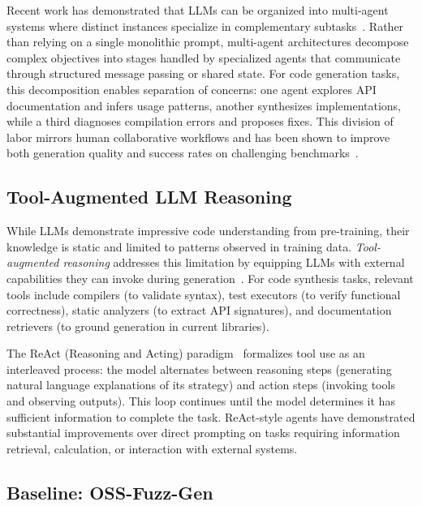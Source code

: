 \documentclass[sigconf,review,anonymous]{acmart}
\begin{document}
Recent work has demonstrated that LLMs can be organized into multi-agent systems where distinct instances specialize in complementary subtasks~\cite{CITE:MultiAgentCode}. Rather than relying on a single monolithic prompt, multi-agent architectures decompose complex objectives into stages handled by specialized agents that communicate through structured message passing or shared state. For code generation tasks, this decomposition enables separation of concerns: one agent explores API documentation and infers usage patterns, another synthesizes implementations, while a third diagnoses compilation errors and proposes fixes. This division of labor mirrors human collaborative workflows and has been shown to improve both generation quality and success rates on challenging benchmarks~\cite{CITE:AgentBench}.

\subsection{Tool-Augmented LLM Reasoning}
\label{sec:prelim:tools}

While LLMs demonstrate impressive code understanding from pre-training, their knowledge is static and limited to patterns observed in training data. \emph{Tool-augmented reasoning} addresses this limitation by equipping LLMs with external capabilities they can invoke during generation~\cite{DBLP:conf/nips/SchickDSHWSCSW23:Toolformer,CITE:ToolLLM}. For code synthesis tasks, relevant tools include compilers (to validate syntax), test executors (to verify functional correctness), static analyzers (to extract API signatures), and documentation retrievers (to ground generation in current libraries).

The ReAct (Reasoning and Acting) paradigm~\cite{DBLP:conf/iclr/YaoZYDN023:ReAct} formalizes tool use as an interleaved process: the model alternates between reasoning steps (generating natural language explanations of its strategy) and action steps (invoking tools and observing outputs). This loop continues until the model determines it has sufficient information to complete the task. ReAct-style agents have demonstrated substantial improvements over direct prompting on tasks requiring information retrieval, calculation, or interaction with external systems.

\subsection{Baseline: OSS-Fuzz-Gen}
\label{sec:prelim:ossfuzzgen}
\end{document}
